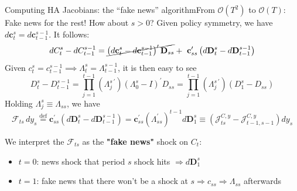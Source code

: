 \documentclass[aspectratio=169]{beamer}
\begin{document}
\begin{frame}{Computing HA Jacobians: the ``fake news'' algorithm}{From $\mathcal{O}(T^2)$ to $\mathcal{O}(T)$: Fake news for the rest!}
    How about $s > 0$? Given policy symmetry, we have $d\mathbf{c}_t^s = d\mathbf{c}_{t-1}^{s-1}$. It follows:
    \[
        dC_t^s - dC_{t-1}^{s-1} =\cancel{ \left( d\mathbf{c}_t^s - d\mathbf{c}_{t-1}^{s-1} \right)^\prime \mathbf{D}_{ss}}
        +\ \mathbf{c}_{ss}^\prime \left( d\mathbf{D}_t^s - d\mathbf{D}_{t-1}^{s-1} \right)
    \]
    Given \alert{$c_t^s = c_{t-1}^{s-1} \implies \Lambda_t^s = \Lambda_{t-1}^{s-1}$, } it is then easy to see
    \[
        D_t^s - D_{t-1}^{s-1}
        = \prod_{j=1}^{t-1} \left( \Lambda_j^{s\,\prime} \right) \left( \Lambda_0^{s} - I \right)^\prime D_{ss}
        = \prod_{j=1}^{t-1} \left( \Lambda_j^{s\,\prime} \right) ( D_1^s - D_{ss} )
    \]
    Holding $\Lambda_j^{s} \equiv \Lambda_{ss}$, we have
    \begin{equation}
        \mathcal{F}_{ts}\,dy_s \overset{\text{def}}{=}
        \mathbf{c}_{ss}^\prime \left(d\mathbf{D}_t^s - d\mathbf{D}_{t-1}^{s-1}\right)
        = \mathbf{c}_{ss}^\prime \left( \Lambda_{ss}^\prime \right)^{t-1} d\mathbf{D}_1^s
        \equiv \left( \mathcal{J}_{ts}^{C,y} - \mathcal{J}_{t-1,s-1}^{C,y} \right) dy_s \label{eq:fake_news}
    \end{equation}

    We interpret the $\mathcal{F}_{ts}$ as the \textbf{"fake news"} shock on $C_t$:
    \begin{itemize}
        \item[$\bullet$] $t = 0$: news shock that period $s$ shock hits $\Rightarrow d\mathbf{D}_1^s$
        \item[$\bullet$] $t = 1$: fake news that there won't be a shock at $s \Rightarrow c_{ss} \Rightarrow \Lambda_{ss}$ afterwards
    \end{itemize}
\end{frame}
\end{document}
